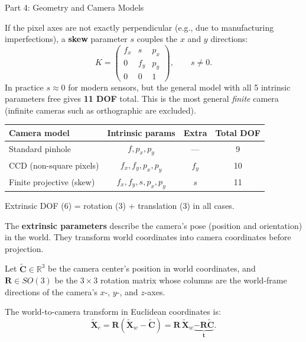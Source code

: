 \documentclass[letterpaper]{article}
\begin{document}
\begin{notes}{Part 4: Geometry and Camera Models}

If the pixel axes are not exactly perpendicular (e.g., due to
manufacturing imperfections), a \textbf{skew} parameter $s$ couples the
$x$ and $y$ directions:
\begin{equation}
  K = \begin{pmatrix}
    f_x & s   & p_x \\
    0   & f_y & p_y \\
    0   & 0   & 1
  \end{pmatrix}, \qquad s \neq 0.
\end{equation}
In practice $s \approx 0$ for modern sensors, but the general model with
all 5 intrinsic parameters free gives \textbf{11 DOF} total.  This is the
most general \emph{finite} camera (infinite cameras such as orthographic
are excluded).


\begin{center}
\begin{tabular}{lccc}
  \toprule
  Camera model & Intrinsic params & Extra & Total DOF \\
  \midrule
  Standard pinhole        & $f, p_x, p_y$         & ---       & 9  \\
  CCD (non-square pixels) & $f_x, f_y, p_x, p_y$  & $f_y$     & 10 \\
  Finite projective (skew)& $f_x, f_y, s, p_x, p_y$ & $s$    & 11 \\
  \bottomrule
\end{tabular}
\end{center}

\noindent Extrinsic DOF (6) = rotation (3) + translation (3) in all cases.



The \textbf{extrinsic parameters} describe the camera's pose (position and
orientation) in the world.  They transform world coordinates into camera
coordinates before projection.

Let $\widetilde{\mathbf{C}} \in \mathbb{R}^3$ be the camera center's
position in world coordinates, and $\mathbf{R} \in SO(3)$ be the
$3\times 3$ rotation matrix whose columns are the world-frame directions
of the camera's $x$-, $y$-, and $z$-axes.

The world-to-camera transform in Euclidean coordinates is:
\begin{equation}
  \widetilde{\mathbf{X}}_c
  = \mathbf{R}\!\left(\widetilde{\mathbf{X}}_w - \widetilde{\mathbf{C}}\right)
  = \mathbf{R}\,\widetilde{\mathbf{X}}_w \underbrace{- \mathbf{R}\widetilde{\mathbf{C}}}_{\mathbf{t}}.
\end{equation}


\end{notes}
\end{document}
